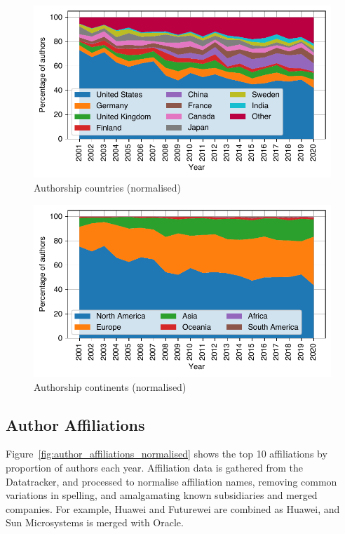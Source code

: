 \documentclass[twocolumn,10pt]{article}
\newlength{\figureWidthOneColumn}
\begin{document}
\begin{figure}
  \centering
  \includegraphics[width=\figureWidthOneColumn]{figures-prev/imc-2021/authors/top5_countries_normalised.pdf}
  \caption{
    Authorship countries (normalised)
  }
  \label{fig:author_countries_normalised}
\end{figure}

\begin{figure}
  \centering
  \includegraphics[width=\figureWidthOneColumn]{figures-prev/imc-2021/authors/continents_normalised.pdf}
  \caption{
    Authorship continents (normalised)
  }
  \label{fig:author_continents_normalised}
\end{figure}

\subsection{Author Affiliations}
\label{sec:trends-demographics:affiliation}

Figure~\ref{fig:author_affiliations_normalised} shows the top 10
affiliations by proportion of authors each year. Affiliation data is
gathered from the Datatracker, and processed to normalise affiliation
names, removing common variations in spelling, and amalgamating known
subsidiaries and merged companies. For example, Huawei and Futurewei are
combined as Huawei, and Sun Microsystems is merged with Oracle.
\end{document}

